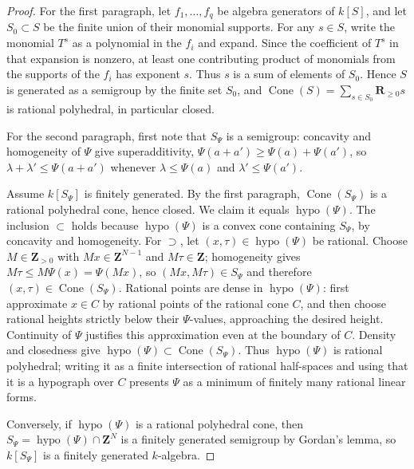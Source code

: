 \begin{proof}
For the first paragraph, let $f_1,\dots,f_q$ be algebra generators of
$k[S]$, and let $S_0\subset S$ be the finite union of their monomial
supports.  For any $s\in S$, write the monomial $T^s$ as a polynomial in
the $f_i$ and expand.  Since the coefficient of $T^s$ in that expansion is
nonzero, at least one contributing product of monomials from the supports
of the $f_i$ has exponent $s$.  Thus $s$ is a sum of elements of $S_0$.
Hence $S$ is generated as a semigroup by the finite set $S_0$, and
$\operatorname{Cone}(S)=\sum_{s\in S_0}\mathbf R_{\geq0}s$ is rational
polyhedral, in particular closed.

For the second paragraph, first note that $S_\Psi$ is a semigroup:
concavity and homogeneity of $\Psi$ give superadditivity,
$\Psi(a+a')\geq\Psi(a)+\Psi(a')$, so
$\lambda+\lambda'\leq\Psi(a+a')$ whenever
$\lambda\leq\Psi(a)$ and $\lambda'\leq\Psi(a')$.

Assume $k[S_\Psi]$ is finitely generated.  By the first paragraph,
$\operatorname{Cone}(S_\Psi)$ is a rational polyhedral cone, hence
closed.  We claim it equals $\operatorname{hypo}(\Psi)$.  The inclusion
$\subset$ holds because $\operatorname{hypo}(\Psi)$ is a convex cone
containing $S_\Psi$, by concavity and homogeneity.  For $\supset$, let
$(x,\tau)\in\operatorname{hypo}(\Psi)$ be rational.  Choose
$M\in\mathbf Z_{>0}$ with $Mx\in\mathbf Z^{N-1}$ and
$M\tau\in\mathbf Z$; homogeneity gives
$M\tau\leq M\Psi(x)=\Psi(Mx)$, so $(Mx,M\tau)\in S_\Psi$ and therefore
$(x,\tau)\in\operatorname{Cone}(S_\Psi)$.  Rational points are dense in $\operatorname{hypo}(\Psi)$: first
approximate $x\in C$ by rational points of the rational cone $C$,
and then choose rational heights strictly below their $\Psi$-values,
approaching the desired height.  Continuity of $\Psi$ justifies this
approximation even at the boundary of $C$.  Density and closedness give
$\operatorname{hypo}(\Psi)\subset\operatorname{Cone}(S_\Psi)$.  Thus
$\operatorname{hypo}(\Psi)$ is rational polyhedral; writing it as a finite
intersection of rational half-spaces and using that it is a hypograph over
$C$ presents $\Psi$ as a minimum of finitely many rational linear
forms.

Conversely, if $\operatorname{hypo}(\Psi)$ is a rational polyhedral cone,
then $S_\Psi=\operatorname{hypo}(\Psi)\cap\mathbf Z^N$ is a finitely
generated semigroup by Gordan's lemma, so $k[S_\Psi]$ is a finitely
generated $k$-algebra.
\end{proof}

